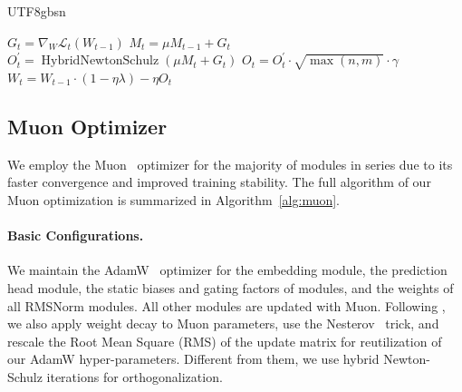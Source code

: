 \begin{CJK*}{UTF8}{gbsn}
\begin{algorithm}[t]
\caption{Muon Optimizer for \dsviv{}}
\label{alg:muon}
\begin{algorithmic}[1]
        \State $G_t = \nabla_{W} \mathcal{L}_t(W_{t-1})$ 
        \State $M_t = \mu M_{t-1} + G_t$ 
        \State $O^{\prime}_t = \operatorname{HybridNewtonSchulz}(\mu M_t + G_t)$ 
        \State $O_t = O^{\prime}_t \cdot \sqrt{\max(n, m)} \cdot \gamma$ 
        \State $W_t = W_{t-1} \cdot \left( 1 - \eta \lambda \right) - \eta O_t$ 
    \EndFor
\EndFor
\end{algorithmic}
\end{algorithm}

\subsection{Muon Optimizer}

We employ the Muon~\citep{muon,muon_kimi} optimizer for the majority of modules in \dsviv{} series due to its faster convergence and improved training stability.
The full algorithm of our Muon optimization is summarized in Algorithm~\ref{alg:muon}.

\paragraph{Basic Configurations.}
We maintain the AdamW~\citep{adamW} optimizer for the embedding module, the prediction head module, the static biases and gating factors of \mhc{} modules, and the weights of all RMSNorm modules. 
All other modules are updated with Muon.
Following \citet{muon_kimi}, we also apply weight decay to Muon parameters, use the Nesterov~\citep{nesterov,muon} trick, and rescale the Root Mean Square (RMS) of the update matrix for reutilization of our AdamW hyper-parameters.
Different from them, we use hybrid Newton-Schulz iterations for orthogonalization.


\end{CJK*}
